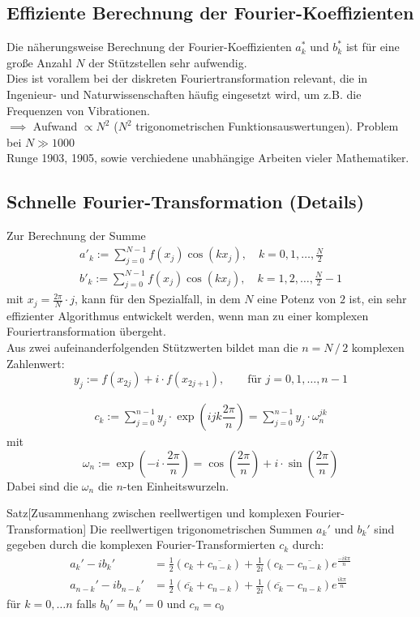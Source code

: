 \subsection{Effiziente Berechnung der Fourier-Koeffizienten}
Die näherungsweise Berechnung der Fourier-Koeffizienten $a_k^*$ und $b_k^*$ ist für eine große Anzahl $N$ der 
Stützstellen sehr aufwendig. \\
Dies ist vorallem bei der diskreten Fouriertransformation relevant, die in Ingenieur- und Naturwissenschaften 
häufig eingesetzt wird, um z.B. die Frequenzen von Vibrationen. \\
$\implies$ Aufwand $\propto N^2$ ($N^2$ trigonometrischen Funktionsauswertungen). Problem bei $N\gg 1000$ \\
Runge 1903, 1905, sowie verchiedene unabhängige Arbeiten vieler Mathematiker.
\subsection{Schnelle Fourier-Transformation (Details)}
Zur Berechnung der Summe
\begin{align*}
    a'_k := \sum_{j=0}^{N-1} f(x_j)\cos(kx_j), \quad k=0,1,\dotsc,\tfrac{N}{2} \\
    b'_k := \sum_{j=0}^{N-1} f(x_j)\cos(kx_j), \quad k=1,2,\dotsc,\tfrac{N}{2}-1 
\end{align*}
mit $x_j=\tfrac{2\pi}{N}\cdot j$, kann für den Spezialfall, in dem $N$ eine Potenz von $2$ ist, ein sehr effizienter 
Algorithmus entwickelt werden, wenn man zu einer komplexen Fouriertransformation übergeht. \\
Aus zwei aufeinanderfolgenden Stützwerten bildet man die $n=N\,/\,2$ komplexen Zahlenwert:
\[y_j := f(x_{2j}) + i\cdot f(x_{2j+1}),\qquad \text{für } j=0,1,\dotsc,n-1\]
\begin{defbox}
    \begin{align*}
        c_k := \sum_{j=0}^{n-1} y_j\cdot \exp\left(ijk\dfrac{2\pi}{n}\right) = \sum_{j=0}^{n-1} y_j\cdot \omega_n^{jk}
    \end{align*}
    mit 
    \[\omega_n := \exp\left(-i\cdot\dfrac{2\pi}{n}\right) = \cos\left(\dfrac{2\pi}{n}\right)+i\cdot\sin\left(\dfrac{2\pi}{n}\right)\]
    Dabei sind die $\omega_n$ die $n$-ten Einheitswurzeln.
\end{defbox}
\newpage
\begin{thmbox}{Satz}[Zusammenhang zwischen reellwertigen und komplexen Fourier-Transformation]
    Die reellwertigen trigonometrischen Summen $a_k'$ und $b_k'$ sind gegeben durch die komplexen 
    Fourier-Transformierten $c_k$ durch:
    \begin{align*}
    a_k'-ib_k'&=\tfrac{1}{2}(c_k+\overline{c_{n-k}}) + \tfrac{1}{2i}(c_k-\overline{c_{n-k}})e^{\tfrac{-ik\pi}{n}} \\
    a_{n-k}'-ib_{n-k}'&=\tfrac{1}{2}(\overline{c_k}+c_{n-k}) + \tfrac{1}{2i}(\overline{c_k}-c_{n-k})e^{\tfrac{ik\pi}{n}}
    \end{align*}
    für $k=0,\dots n$ falls $b_0'=b_n'=0$ und $c_n=c_0$
\end{thmbox}
